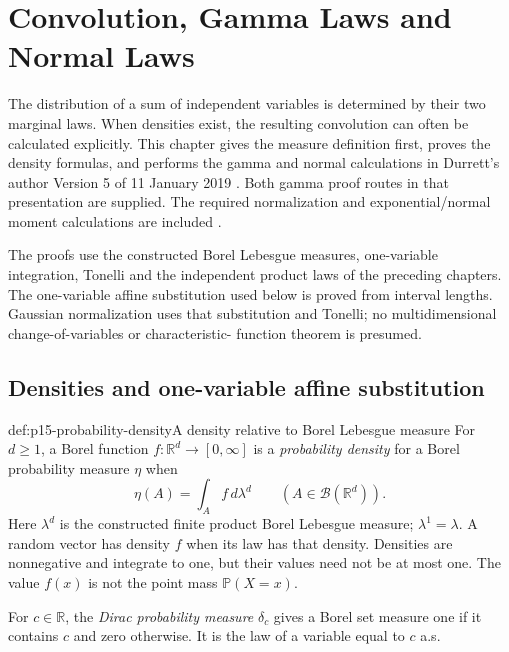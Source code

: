 \chapter{Convolution, Gamma Laws and Normal Laws}
\label{sec:p15-convolution-gamma-normal}

The distribution of a sum of independent variables is determined by
their two marginal laws. When densities exist, the resulting convolution
can often be calculated explicitly. This chapter gives the measure
definition first, proves the density formulas, and performs the gamma
and normal calculations in Durrett's author Version 5 of 11 January 2019
\cite[results~2.1.15--2.1.20, pp.~49--52]{DurrettPTEAuthor2019}.
Both gamma proof routes in that presentation are supplied. The required
normalization and exponential/normal moment calculations are included
\cite[examples~1.6.10--1.6.11, pp.~33--34]{DurrettPTEAuthor2019}.

The proofs use the constructed Borel Lebesgue measures, one-variable
integration, Tonelli and the independent product laws of the preceding
chapters. The one-variable affine substitution used below is proved
from interval lengths. Gaussian normalization uses that substitution
and Tonelli; no multidimensional change-of-variables or characteristic-
function theorem is presumed.

\section{Densities and one-variable affine substitution}
\label{sec:p15-convolution-density-foundations}

\begin{hbdefinition}{def:p15-probability-density}{A density relative to Borel Lebesgue measure}
For \(d\geq1\), a Borel function \(f:\mathbb R^d\to[0,\infty]\)
is a \emph{probability density} for a Borel probability measure \(\eta\)
when
\[
 \eta(A)=\int_A f\,d\lambda^d
                 \qquad(A\in\mathcal B(\mathbb R^d)).
\]
Here \(\lambda^d\) is the constructed finite product Borel Lebesgue
measure; \(\lambda^1=\lambda\). A random vector has density \(f\)
when its law has that density. Densities are nonnegative and integrate
to one, but their values need not be at most one. The value \(f(x)\)
is not the point mass \(\mathbb P(X=x)\).

For \(c\in\mathbb R\), the \emph{Dirac probability measure}
\(\delta_c\) gives a Borel set measure one if it contains \(c\)
and zero otherwise. It is the law of a variable equal to \(c\) a.s.
\end{hbdefinition}


